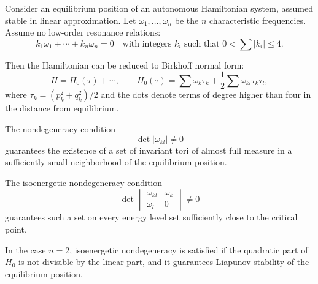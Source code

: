 Consider an equilibrium position of an autonomous Hamiltonian system, assumed stable in linear approximation. Let $\omega_1, \ldots, \omega_n$ be the $n$ characteristic frequencies. Assume no low-order resonance relations:
$$k_1 \omega_1 + \cdots + k_n \omega_n = 0 \quad \text{with integers } k_i \text{ such that } 0 < \sum |k_i| \leq 4.$$

Then the Hamiltonian can be reduced to Birkhoff normal form:
$$H = H_0(\tau) + \cdots, \qquad H_0(\tau) = \sum \omega_k \tau_k + \frac{1}{2} \sum \omega_{kl} \tau_k \tau_l,$$
where $\tau_k = (p_k^2 + q_k^2)/2$ and the dots denote terms of degree higher than four in the distance from equilibrium.

The nondegeneracy condition
$$\det |\omega_{kl}| \neq 0$$
guarantees the existence of a set of invariant tori of almost full measure in a sufficiently small neighborhood of the equilibrium position.

The isoenergetic nondegeneracy condition
$$\det \begin{vmatrix} \omega_{kl} & \omega_k \\ \omega_l & 0 \end{vmatrix} \neq 0$$
guarantees such a set on every energy level set sufficiently close to the critical point.

In the case $n = 2$, isoenergetic nondegeneracy is satisfied if the quadratic part of $H_0$ is not divisible by the linear part, and it guarantees Liapunov stability of the equilibrium position.
